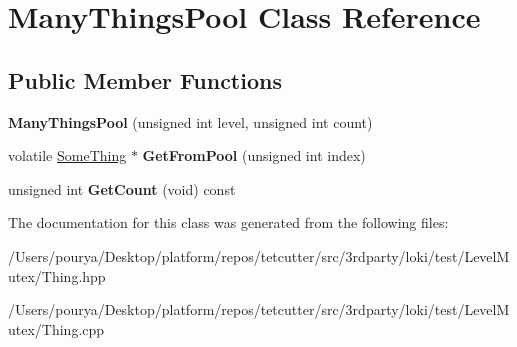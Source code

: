 \hypertarget{classManyThingsPool}{}\section{Many\+Things\+Pool Class Reference}
\label{classManyThingsPool}
\subsection*{Public Member Functions}
\begin{DoxyCompactItemize}
\item 
\hypertarget{classManyThingsPool_a1293ce4c38f90b9eb5b3f8a5b3cc5241}{}{\bfseries Many\+Things\+Pool} (unsigned int level, unsigned int count)\label{classManyThingsPool_a1293ce4c38f90b9eb5b3f8a5b3cc5241}

\item 
\hypertarget{classManyThingsPool_afd77c0fd36a86e713237265d7731956a}{}volatile \hyperlink{classSomeThing}{Some\+Thing} $\ast$ {\bfseries Get\+From\+Pool} (unsigned int index)\label{classManyThingsPool_afd77c0fd36a86e713237265d7731956a}

\item 
\hypertarget{classManyThingsPool_a1133579f6fbfd4c53083c4b421783a93}{}unsigned int {\bfseries Get\+Count} (void) const \label{classManyThingsPool_a1133579f6fbfd4c53083c4b421783a93}

\end{DoxyCompactItemize}


The documentation for this class was generated from the following files\+:\begin{DoxyCompactItemize}
\item 
/\+Users/pourya/\+Desktop/platform/repos/tetcutter/src/3rdparty/loki/test/\+Level\+Mutex/Thing.\+hpp\item 
/\+Users/pourya/\+Desktop/platform/repos/tetcutter/src/3rdparty/loki/test/\+Level\+Mutex/Thing.\+cpp\end{DoxyCompactItemize}
